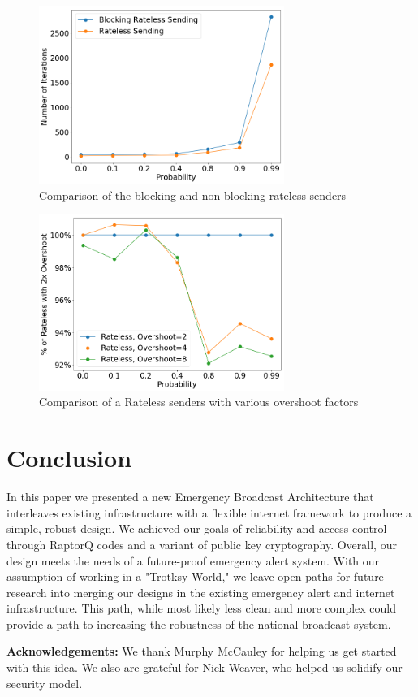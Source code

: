 \begin{figure}[tp]
\centering
\noindent
\includegraphics[width=8cm]{figures/big_font/BLOCKING_RATELESS_BETTER.png}
\caption{Comparison of the blocking and non-blocking rateless senders}
\label{graph:blockingvsnot}
\end{figure}

\begin{figure}[tp]
\centering
\noindent
\includegraphics[width=8cm]{figures/FACTOR_VARY_FOCUS.png}
\caption{Comparison of a Rateless senders with various overshoot factors}
\label{graph:varyParams}
\end{figure}

\section{Conclusion}
In this paper we presented a new Emergency Broadcast Architecture that interleaves existing infrastructure with a flexible internet framework to produce a simple, robust design. We achieved our goals of reliability and access control through RaptorQ codes and a variant of public key cryptography. Overall, our design meets the needs of a future-proof emergency alert system. With our assumption of working in a "Trotksy World," we leave open paths for future research into merging our designs in the existing emergency alert and internet infrastructure. This path, while most likely less clean and more complex could provide a path to increasing the robustness of the national broadcast system.

\textbf{Acknowledgements:} We thank Murphy McCauley for helping us get started with this idea. We also are grateful for Nick Weaver, who helped us solidify our security model.

